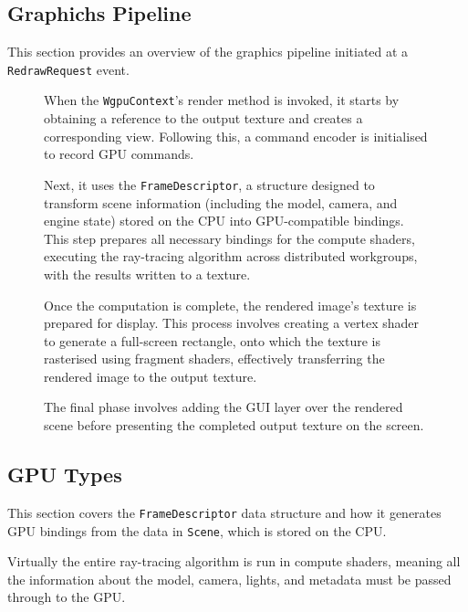 \subsection{Graphichs Pipeline}
This section provides an overview of the graphics pipeline initiated at a \verb|RedrawRequest| event.

\begin{figure}[H]
\noindent\begin{minipage}[t]{0.65\textwidth}
  \vspace{0.5cm}
  When the \verb|WgpuContext|'s render method is invoked, it starts by obtaining a reference to the output texture and creates a corresponding view. Following this, a command encoder is initialised to record GPU commands.

  Next, it uses the \verb|FrameDescriptor|, a structure designed to transform scene information (including the model, camera, and engine state) stored on the CPU into GPU-compatible bindings. This step prepares all necessary bindings for the compute shaders, executing the ray-tracing algorithm across distributed workgroups, with the results written to a texture.

  Once the computation is complete, the rendered image's texture is prepared for display. This process involves creating a vertex shader to generate a full-screen rectangle, onto which the texture is rasterised using fragment shaders, effectively transferring the rendered image to the output texture.

  The final phase involves adding the GUI layer over the rendered scene before presenting the completed output texture on the screen.
\end{minipage}
\hfill
\begin{minipage}[t]{0.3\textwidth}
  \vspace{-0.5cm}
  \begin{figure}[H]
    \centering
    
  \end{figure}
\end{minipage}
\end{figure}

\subsection{GPU Types}\label{gputypes}
This section covers the \verb|FrameDescriptor| data structure and how it generates GPU bindings from the data in \verb|Scene|, which is stored on the CPU.

Virtually the entire ray-tracing algorithm is run in compute shaders, meaning all the information about the model, camera, lights, and metadata must be passed through to the GPU.

